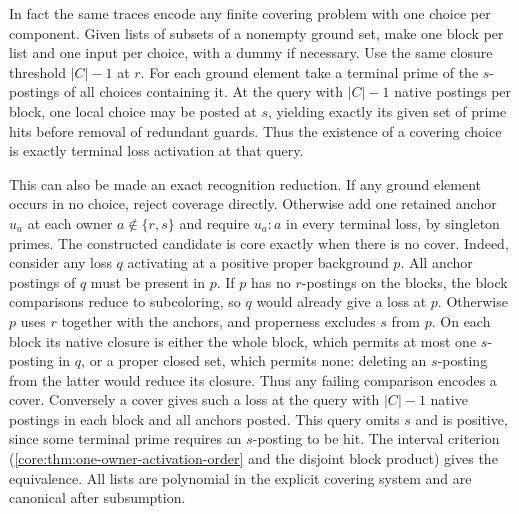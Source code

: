 In fact the same traces encode any finite covering problem
with one choice per component. Given lists of subsets of a
nonempty ground set, make one block per list and one input
per choice, with a dummy if necessary. Use the same closure
threshold $|C|-1$ at $r$. For each ground element take a
terminal prime of the $s$-postings of all choices containing
it. At the query with $|C|-1$ native postings per block,
one local choice may be posted at $s$, yielding exactly
its given set of prime hits before removal of redundant
guards. Thus the existence of a covering choice is exactly
terminal loss activation at that query.

This can also be made an exact recognition reduction.
If any ground element occurs in no choice, reject coverage
directly. Otherwise add one retained anchor $u_a$ at each
owner $a\notin\{r,s\}$ and require $u_a:a$ in every
terminal loss, by singleton primes. The constructed
candidate is core exactly when there is no cover.
Indeed, consider any loss $q$ activating at a positive
proper background $p$. All anchor postings of $q$ must
be present in $p$. If $p$ has no $r$-postings on the
blocks, the block comparisons reduce to subcoloring, so
$q$ would already give a loss at $p$. Otherwise $p$ uses
$r$ together with the anchors, and properness excludes
$s$ from $p$. On each block its native closure is either
the whole block, which permits at most one $s$-posting
in $q$, or a proper closed set, which permits none:
deleting an $s$-posting from the latter would reduce
its closure. Thus any failing comparison encodes a cover.
Conversely a cover gives such a loss at the query with
$|C|-1$ native postings in each block and all anchors
posted. This query omits $s$ and is positive, since some
terminal prime requires an $s$-posting to be hit.
The interval criterion
(\cref{core:thm:one-owner-activation-order} and the
disjoint block product) gives the equivalence. All lists
are polynomial in the explicit covering system and are
canonical after subsumption.

